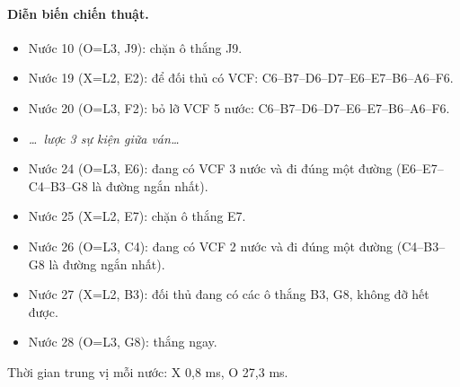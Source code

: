 \paragraph{Diễn biến chiến thuật.}
\begin{itemize}\footnotesize\linespread{1.1}\selectfont
\setlength{\itemsep}{0pt}
  \item Nước 10 (O=L3, J9): chặn ô thắng J9.
  \item Nước 19 (X=L2, E2): để đối thủ có VCF: C6--B7--D6--D7--E6--E7--B6--A6--F6.
  \item Nước 20 (O=L3, F2): bỏ lỡ VCF 5 nước: C6--B7--D6--D7--E6--E7--B6--A6--F6.
  \item[] \emph{\dots\ lược 3 sự kiện giữa ván\dots}
  \item Nước 24 (O=L3, E6): đang có VCF 3 nước và đi đúng một đường (E6--E7--C4--B3--G8 là đường ngắn nhất).
  \item Nước 25 (X=L2, E7): chặn ô thắng E7.
  \item Nước 26 (O=L3, C4): đang có VCF 2 nước và đi đúng một đường (C4--B3--G8 là đường ngắn nhất).
  \item Nước 27 (X=L2, B3): đối thủ đang có các ô thắng B3, G8, không đỡ hết được.
  \item Nước 28 (O=L3, G8): thắng ngay.
\end{itemize}
Thời gian trung vị mỗi nước: X 0,8 ms, O 27,3 ms.
\clearpage

